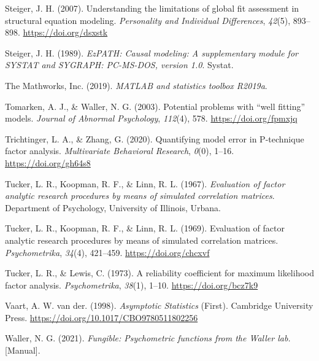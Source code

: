 \documentclass[11pt]{umnthesis}
\newlength{\cslhangindent}
\newenvironment{CSLReferences}[2] %
 {%
  \setlength{\parindent}{0pt}
  \ifodd #1 \everypar{\setlength{\hangindent}{\cslhangindent}}\ignorespaces\fi
  \ifnum #2 > 0
  \setlength{\parskip}{#2\baselineskip}
  \fi
 }%
 {}
\begin{document}
\begin{CSLReferences}{1}{0}
\leavevmode{}%
Steiger, J. H. (2007). Understanding the limitations of global fit assessment in structural equation modeling. \emph{Personality and Individual Differences}, \emph{42}(5), 893--898. \url{https://doi.org/dsxstk}

\leavevmode{}%
Steiger, J. H. (1989). \emph{{EzPATH}: Causal modeling: A supplementary module for {SYSTAT} and {SYGRAPH}: {PC-MS-DOS}, version 1.0}. {Systat}.

\leavevmode{}%
The Mathworks, Inc. (2019). \emph{{MATLAB} and statistics toolbox R2019a}.

\leavevmode{}%
Tomarken, A. J., \& Waller, N. G. (2003). Potential problems with {``well fitting''} models. \emph{Journal of Abnormal Psychology}, \emph{112}(4), 578. \url{https://doi.org/fpmxjq}

\leavevmode{}%
Trichtinger, L. A., \& Zhang, G. (2020). Quantifying model error in {P-technique} factor analysis. \emph{Multivariate Behavioral Research}, \emph{0}(0), 1--16. \url{https://doi.org/gh64s8}

\leavevmode{}%
Tucker, L. R., Koopman, R. F., \& Linn, R. L. (1967). \emph{Evaluation of factor analytic research procedures by means of simulated correlation matrices}. {Department of Psychology, University of Illinois, Urbana}.

\leavevmode{}%
Tucker, L. R., Koopman, R. F., \& Linn, R. L. (1969). Evaluation of factor analytic research procedures by means of simulated correlation matrices. \emph{Psychometrika}, \emph{34}(4), 421--459. \url{https://doi.org/chcxvf}

\leavevmode{}%
Tucker, L. R., \& Lewis, C. (1973). A reliability coefficient for maximum likelihood factor analysis. \emph{Psychometrika}, \emph{38}(1), 1--10. \url{https://doi.org/bcz7k9}

\leavevmode{}%
Vaart, A. W. van der. (1998). \emph{Asymptotic {Statistics}} (First). {Cambridge University Press}. \url{https://doi.org/10.1017/CBO9780511802256}

\leavevmode{}%
Waller, N. G. (2021). \emph{Fungible: {Psychometric} functions from the {Waller} lab.} {[}Manual{]}.


\end{CSLReferences}
\end{document}
